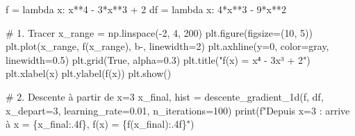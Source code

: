 \documentclass[
  french,
  11pt,
  a4paper,
]{scrbook}
\newenvironment{Shaded}{}{}
\newcommand{\BuiltInTok}[1]{\textcolor[rgb]{0.84,0.23,0.29}{#1}}
\newcommand{\CommentTok}[1]{\textcolor[rgb]{0.42,0.45,0.49}{#1}}
\newcommand{\DecValTok}[1]{\textcolor[rgb]{0.00,0.36,0.77}{#1}}
\newcommand{\FloatTok}[1]{\textcolor[rgb]{0.00,0.36,0.77}{#1}}
\newcommand{\KeywordTok}[1]{\textcolor[rgb]{0.84,0.23,0.29}{#1}}
\newcommand{\NormalTok}[1]{\textcolor[rgb]{0.14,0.16,0.18}{#1}}
\newcommand{\OperatorTok}[1]{\textcolor[rgb]{0.14,0.16,0.18}{#1}}
\newcommand{\SpecialCharTok}[1]{\textcolor[rgb]{0.00,0.36,0.77}{#1}}
\newcommand{\SpecialStringTok}[1]{\textcolor[rgb]{0.01,0.18,0.38}{#1}}
\newcommand{\StringTok}[1]{\textcolor[rgb]{0.01,0.18,0.38}{#1}}
\newcommand{\VariableTok}[1]{\textcolor[rgb]{0.89,0.38,0.04}{#1}}
\begin{document}
\begin{tcolorbox}[enhanced jigsaw, arc=.35mm, bottomrule=.15mm, bottomtitle=1mm, breakable, colback=white, colbacktitle=quarto-callout-tip-color!10!white, colframe=quarto-callout-tip-color-frame, coltitle=black, left=2mm, leftrule=.75mm, opacityback=0, opacitybacktitle=0.6, rightrule=.15mm, title=\textcolor{quarto-callout-tip-color}{\faLightbulb}\hspace{0.5em}{✅ Voir la correction}, titlerule=0mm, toprule=.15mm, toptitle=1mm]

\begin{Shaded}
\begin{Highlighting}[]
\NormalTok{f }\OperatorTok{=} \KeywordTok{lambda}\NormalTok{ x: x}\OperatorTok{**}\DecValTok{4} \OperatorTok{{-}} \DecValTok{3}\OperatorTok{*}\NormalTok{x}\OperatorTok{**}\DecValTok{3} \OperatorTok{+} \DecValTok{2}
\NormalTok{df }\OperatorTok{=} \KeywordTok{lambda}\NormalTok{ x: }\DecValTok{4}\OperatorTok{*}\NormalTok{x}\OperatorTok{**}\DecValTok{3} \OperatorTok{{-}} \DecValTok{9}\OperatorTok{*}\NormalTok{x}\OperatorTok{**}\DecValTok{2}

\CommentTok{\# 1. Tracer}
\NormalTok{x\_range }\OperatorTok{=}\NormalTok{ np.linspace(}\OperatorTok{{-}}\DecValTok{2}\NormalTok{, }\DecValTok{4}\NormalTok{, }\DecValTok{200}\NormalTok{)}
\NormalTok{plt.figure(figsize}\OperatorTok{=}\NormalTok{(}\DecValTok{10}\NormalTok{, }\DecValTok{5}\NormalTok{))}
\NormalTok{plt.plot(x\_range, f(x\_range), }\StringTok{\textquotesingle{}b{-}\textquotesingle{}}\NormalTok{, linewidth}\OperatorTok{=}\DecValTok{2}\NormalTok{)}
\NormalTok{plt.axhline(y}\OperatorTok{=}\DecValTok{0}\NormalTok{, color}\OperatorTok{=}\StringTok{\textquotesingle{}gray\textquotesingle{}}\NormalTok{, linewidth}\OperatorTok{=}\FloatTok{0.5}\NormalTok{)}
\NormalTok{plt.grid(}\VariableTok{True}\NormalTok{, alpha}\OperatorTok{=}\FloatTok{0.3}\NormalTok{)}
\NormalTok{plt.title(}\StringTok{"f(x) = x⁴ {-} 3x³ + 2"}\NormalTok{)}
\NormalTok{plt.xlabel(}\StringTok{\textquotesingle{}x\textquotesingle{}}\NormalTok{)}
\NormalTok{plt.ylabel(}\StringTok{\textquotesingle{}f(x)\textquotesingle{}}\NormalTok{)}
\NormalTok{plt.show()}

\CommentTok{\# 2. Descente à partir de x=3}
\NormalTok{x\_final, hist }\OperatorTok{=}\NormalTok{ descente\_gradient\_1d(f, df, x\_depart}\OperatorTok{=}\DecValTok{3}\NormalTok{, learning\_rate}\OperatorTok{=}\FloatTok{0.01}\NormalTok{, n\_iterations}\OperatorTok{=}\DecValTok{100}\NormalTok{)}
\BuiltInTok{print}\NormalTok{(}\SpecialStringTok{f"Depuis x=3  : arrive à x = }\SpecialCharTok{\{}\NormalTok{x\_final}\SpecialCharTok{:.4f\}}\SpecialStringTok{, f(x) = }\SpecialCharTok{\{}\NormalTok{f(x\_final)}\SpecialCharTok{:.4f\}}\SpecialStringTok{"}\NormalTok{)}


\end{Highlighting}
\end{Shaded}
\end{tcolorbox}
\end{document}
